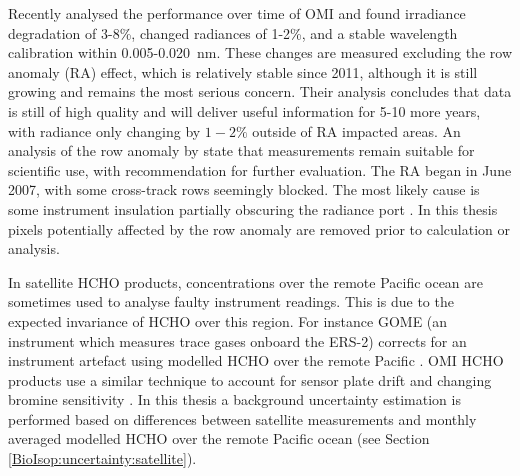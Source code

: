     
    
    Recently \textcite{Schenkeveld2017} analysed the performance over time of OMI and found irradiance degradation of 3-8\%, changed radiances of 1-2\%, and a stable wavelength calibration within 0.005-0.020~nm.
    These changes are measured excluding the row anomaly (RA) effect, which is relatively stable since 2011, although it is still growing and remains the most serious concern.
    Their analysis concludes that data is still of high quality and will deliver useful information for 5-10 more years, with radiance only changing by $1-2\%$ outside of RA impacted areas.
    An analysis of the row anomaly by \textcite{Huang2018} state that measurements remain suitable for scientific use, with recommendation for further evaluation.
    The RA began in June 2007, with some cross-track rows seemingly blocked. 
    The most likely cause is some instrument insulation partially obscuring the radiance port \parencite{Schenkeveld2017}.
    In this thesis pixels potentially affected by the row anomaly are removed prior to calculation or analysis.
    
    In satellite HCHO products, concentrations over the remote Pacific ocean are sometimes used to analyse faulty instrument readings.
    This is due to the expected invariance of HCHO over this region.
    For instance GOME (an instrument which measures trace gases onboard the ERS-2) corrects for an instrument artefact using modelled HCHO over the remote Pacific \parencite{Shim2005}.
    OMI HCHO products use a similar technique to account for sensor plate drift and changing bromine sensitivity \parencite{Abad2015}.
    In this thesis a background uncertainty estimation is performed based on differences between satellite measurements and monthly averaged modelled HCHO over the remote Pacific ocean (see Section \ref{BioIsop:uncertainty:satellite}).
    
